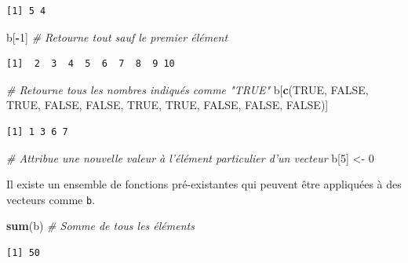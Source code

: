 \documentclass[12pt,]{book}
\newenvironment{Shaded}{\begin{snugshade}}{\end{snugshade}}
\newcommand{\CommentTok}[1]{\textcolor[rgb]{0.56,0.35,0.01}{\textit{#1}}}
\newcommand{\DecValTok}[1]{\textcolor[rgb]{0.00,0.00,0.81}{#1}}
\newcommand{\KeywordTok}[1]{\textcolor[rgb]{0.13,0.29,0.53}{\textbf{#1}}}
\newcommand{\NormalTok}[1]{#1}
\newcommand{\OperatorTok}[1]{\textcolor[rgb]{0.81,0.36,0.00}{\textbf{#1}}}
\newcommand{\OtherTok}[1]{\textcolor[rgb]{0.56,0.35,0.01}{#1}}
\newcommand{\StringTok}[1]{\textcolor[rgb]{0.31,0.60,0.02}{#1}}
\begin{document}
\begin{verbatim}
[1] 5 4
\end{verbatim}

\begin{Shaded}
\begin{Highlighting}[]
\NormalTok{b[}\OperatorTok{-}\DecValTok{1}\NormalTok{]                  }\CommentTok{# Retourne tout sauf le premier élément}
\end{Highlighting}
\end{Shaded}

\begin{verbatim}
[1]  2  3  4  5  6  7  8  9 10
\end{verbatim}

\begin{Shaded}
\begin{Highlighting}[]
\CommentTok{# Retourne tous les nombres indiqués comme "TRUE"}
\NormalTok{b[}\KeywordTok{c}\NormalTok{(}\OtherTok{TRUE}\NormalTok{, }\OtherTok{FALSE}\NormalTok{, }\OtherTok{TRUE}\NormalTok{, }\OtherTok{FALSE}\NormalTok{, }\OtherTok{FALSE}\NormalTok{, }\OtherTok{TRUE}\NormalTok{, }\OtherTok{TRUE}\NormalTok{, }\OtherTok{FALSE}\NormalTok{, }\OtherTok{FALSE}\NormalTok{, }\OtherTok{FALSE}\NormalTok{)]  }
\end{Highlighting}
\end{Shaded}

\begin{verbatim}
[1] 1 3 6 7
\end{verbatim}

\begin{Shaded}
\begin{Highlighting}[]
\CommentTok{# Attribue une nouvelle valeur à l'élément particulier d'un vecteur}
\NormalTok{b[}\DecValTok{5}\NormalTok{] <-}\StringTok{ }\DecValTok{0}
\end{Highlighting}
\end{Shaded}

Il existe un ensemble de fonctions pré-existantes qui peuvent être appliquées à des vecteurs comme \texttt{b}.

\begin{Shaded}
\begin{Highlighting}[]
\KeywordTok{sum}\NormalTok{(b)      }\CommentTok{# Somme de tous les éléments}
\end{Highlighting}
\end{Shaded}

\begin{verbatim}
[1] 50
\end{verbatim}
\end{document}

